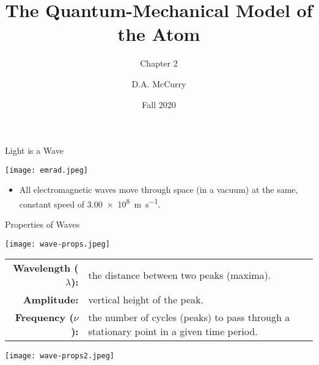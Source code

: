 \documentclass[notes=onlyslideswithnotes,notes=hide]{beamer}
\title{The Quantum-Mechanical Model of the Atom}
\subtitle{Chapter 2}
\institute[CHEM115 Bloomsburg University]{CHEM115 --- Chemistry for the Sciences I \\ Bloomsburg University}
\author{D.A. McCurry}
\date{Fall 2020}
\begin{document}
\maketitle
{}



\begin{frame}{Light is a Wave}
	\begin{center}
		\texttt{[image: emrad.jpeg]}
	\end{center}

	\begin{itemize}
		\item All electromagnetic waves move through space (in a vacuum)
			at the same, constant speed of
			\alert{\SI{3.00e8}{\meter\per\second}}.
	\end{itemize}
\end{frame}

\begin{frame}[allowframebreaks]{Properties of Waves}
	\begin{center}
		\texttt{[image: wave-props.jpeg]}
	\end{center}

	\begin{tabularx}{\linewidth} {>{\bfseries}r X}
		Wavelength ($\lambda$): & the distance between two peaks
			(maxima). \\
		Amplitude: & vertical height of the peak. \\
		Frequency ($\nu$): & the number of cycles (peaks) to pass
			through a stationary point in a given time period.
	\end{tabularx}

	\framebreak

	\begin{center}
		\texttt{[image: wave-props2.jpeg]}
	\end{center}
\end{frame}
\end{document}
